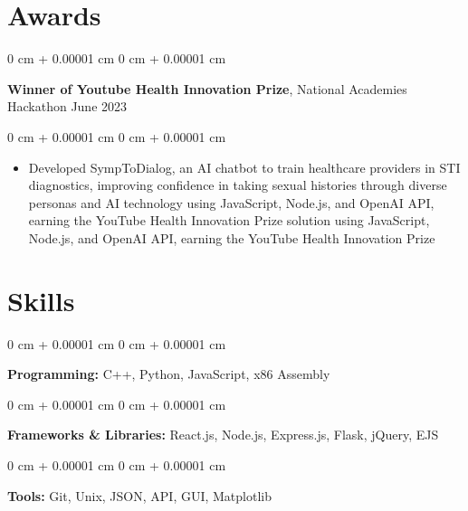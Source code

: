 \documentclass[10pt, letterpaper]{article}
\newenvironment{highlights}{
    \begin{itemize}[
        topsep=0.10 cm,
        parsep=0.10 cm,
        partopsep=0pt,
        itemsep=0pt,
        leftmargin=0 cm + 10pt
    ]
}{
    \end{itemize}
} %
\newenvironment{onecolentry}{
    \begin{adjustwidth}{
        0 cm + 0.00001 cm
    }{
        0 cm + 0.00001 cm
    }
}{
    \end{adjustwidth}
} %
\newenvironment{twocolentry}[2][]{
    \onecolentry
    \def\secondColumn{#2}
    \setcolumnwidth{\fill, 4.5 cm}
    \begin{paracol}{2}
}{
    \switchcolumn \raggedleft \secondColumn
    \end{paracol}
    \endonecolentry
} %
\begin{document}
    
    \section{Awards}



        
        \begin{twocolentry}{
            June 2023
        }
            \textbf{Winner of Youtube Health Innovation Prize}, National Academies Hackathon\end{twocolentry}

        \vspace{0.10 cm}
        \begin{onecolentry}
            \begin{highlights}
                \item Developed SympToDialog, an AI chatbot to train healthcare providers in STI diagnostics, improving confidence in taking sexual histories through diverse personas and AI technology using JavaScript, Node.js, and OpenAI API, earning the YouTube Health Innovation Prize solution using JavaScript, Node.js, and OpenAI API, earning the YouTube Health Innovation Prize
            \end{highlights}
        \end{onecolentry}



    
    \section{Skills}



        
        \begin{onecolentry}
            \textbf{Programming:} C++, Python, JavaScript, x86 Assembly
        \end{onecolentry}

        \vspace{0.2 cm}

        \begin{onecolentry}
            \textbf{Frameworks \& Libraries:} React.js, Node.js, Express.js, Flask, jQuery, EJS
        \end{onecolentry}

        \vspace{0.2 cm}

        \begin{onecolentry}
            \textbf{Tools:} Git, Unix, JSON, API, GUI, Matplotlib
        \end{onecolentry}
\end{document}
